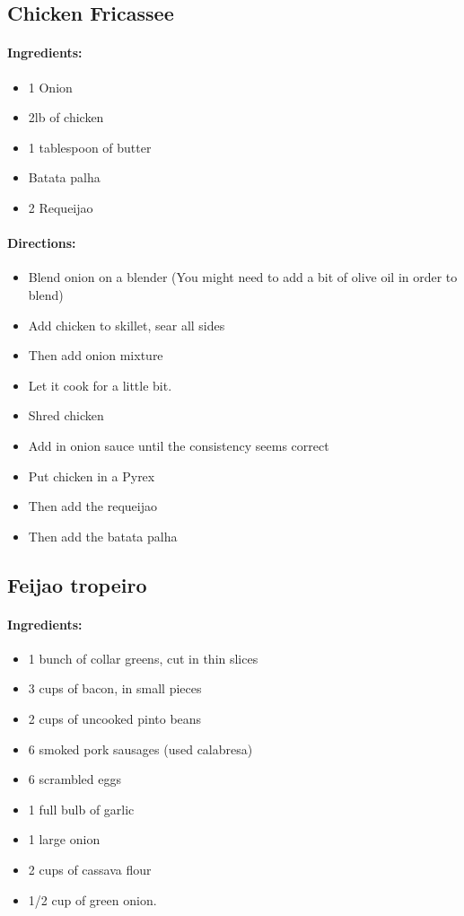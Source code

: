 \documentclass{article}
\begin{document}
\subsection{Chicken Fricassee}

\paragraph{Ingredients:}
\begin{itemize}
    \item 1 Onion
    \item 2lb of chicken
    \item 1 tablespoon of butter
    \item Batata palha
    \item 2 Requeijao
\end{itemize}

\paragraph{Directions:}
\begin{itemize}
    \item Blend onion on a blender (You might need to add a bit of olive oil in order to blend)
    \item Add chicken to skillet, sear all sides
    \item Then add onion mixture
    \item Let it cook for a little bit.
    \item Shred chicken
    \item Add in onion sauce until the consistency seems correct
    \item Put chicken in a Pyrex
    \item Then add the requeijao
    \item Then add the batata palha
\end{itemize}

\subsection{Feijao tropeiro}

\paragraph{Ingredients:}
\begin{itemize}
    \item 1 bunch of collar greens, cut in thin slices
    \item 3 cups of bacon, in small pieces
    \item 2 cups of uncooked pinto beans
    \item 6 smoked pork sausages (used calabresa)
    \item 6 scrambled eggs
    \item 1 full bulb of garlic
    \item 1 large onion
    \item 2 cups of cassava flour
    \item 1/2 cup of green onion.
\end{itemize}
\end{document}
